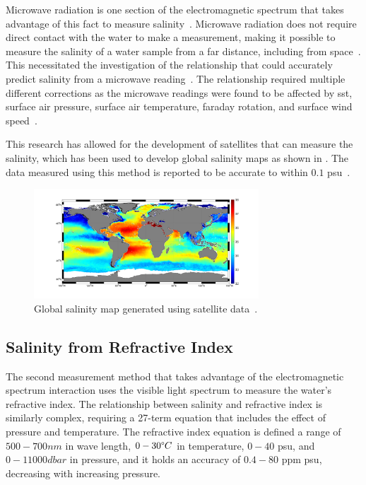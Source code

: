 Microwave radiation is one section of the electromagnetic spectrum that takes advantage of this fact to measure salinity~\cite{swift_considerations_for_microwave_salinity_1983}.
Microwave radiation does not require direct contact with the water to make a measurement, making it possible to measure the salinity of a water sample from a far distance, including from space~\cite{gabarro_microwave_salinity_2004}.
This necessitated the investigation of the relationship that could accurately predict salinity from a microwave reading~\cite{gabarro_microwave_salinity_2004}.
The relationship required multiple different corrections as the microwave readings were found to be affected by \gls{sst}, surface air pressure, surface air temperature, faraday rotation, and surface wind speed~\cite{yueh_microwave_salinity_error_sources_2001}.

This research has allowed for the development of satellites that can measure the salinity, which has been used to develop global salinity maps as shown in .
The data measured using this method is reported to be accurate to within $0.1$ \gls{psu}~\cite{yueh_microwave_salinity_error_sources_2001}.
\begin{figure}[ht]
    \centering
    \includegraphics[width=0.75\textwidth]{Figures/salinity_distribution}
    \caption{Global salinity map generated using satellite data~\cite{esa_mapping_salty_waters_2019}.}
    \label{fig:satellite_salinity_map} %
\end{figure}

\subsection{Salinity from Refractive Index}

The second measurement method that takes advantage of the electromagnetic spectrum interaction uses the visible light spectrum to measure the water's refractive index.
The relationship between salinity and refractive index is similarly complex, requiring a 27-term equation that includes the effect of pressure and temperature.
The refractive index equation is defined a range of $500-700nm$ in wave length, $0-30\degree C$ in temperature, $0-40$ \gls{psu}, and $0-11000 dbar$ in pressure, and it holds an accuracy of $0.4-80$ \gls{ppm} \gls{psu}, decreasing with increasing pressure.~\cite{millard_index_of_refraction_algorithm_1990}

